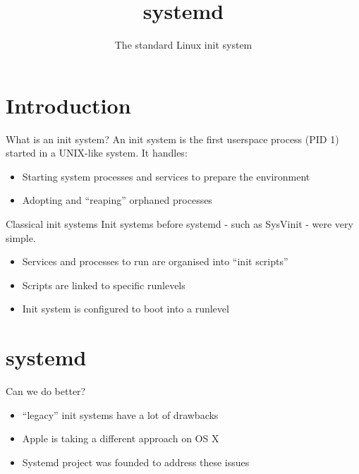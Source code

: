 \documentclass[14pt]{beamer}
\title{systemd}
\subtitle{The standard Linux init system}
\begin{document}

\maketitle

\section{Introduction}

\begin{frame}{What is an init system?}
  An init system is the first userspace process (PID 1) started in a UNIX-like system. It handles:

  \begin{itemize}
  \item Starting system processes and services to prepare the environment
  \item Adopting and ``reaping'' orphaned processes
  \end{itemize}
\end{frame}

\begin{frame}{Classical init systems}
  Init systems before systemd - such as SysVinit - were very simple.

  \begin{itemize}
  \item Services and processes to run are organised into ``init scripts''
  \item Scripts are linked to specific runlevels
  \item Init system is configured to boot into a runlevel
  \end{itemize}

\end{frame}

\section{systemd}

\begin{frame}{Can we do better?}
  \begin{itemize}
  \item ``legacy'' init systems have a lot of drawbacks
  \item Apple is taking a different approach on OS X
  \item Systemd project was founded to address these issues
  \end{itemize}
\end{frame}
\end{document}
